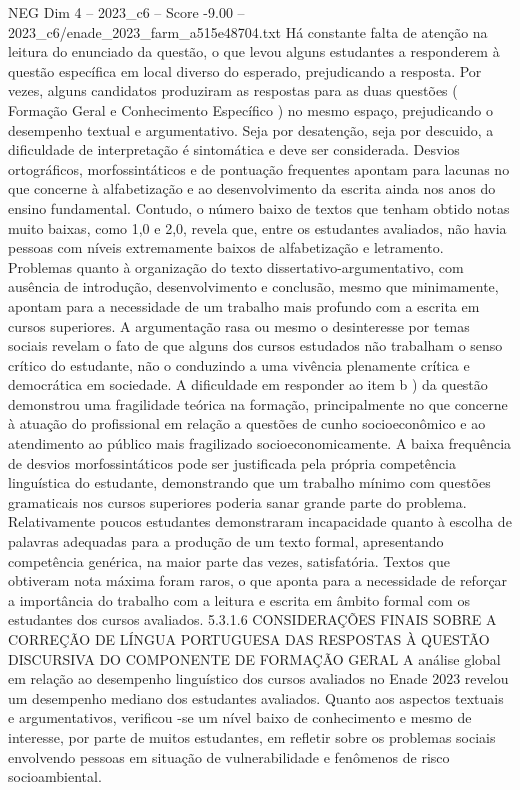 \begin{textsample}{NEG Dim 4 – 2023\_c6 – Score -9.00 – 2023\_c6/enade\_2023\_farm\_a515e48704.txt}
Há constante falta de atenção na leitura do enunciado da questão, o que levou alguns estudantes a responderem à questão específica em local diverso do esperado, prejudicando a resposta.
Por vezes, alguns candidatos produziram as respostas para as duas questões ( Formação Geral e Conhecimento Específico ) no mesmo espaço, prejudicando o desempenho textual e argumentativo.
Seja por desatenção, seja por descuido, a dificuldade de interpretação é sintomática e deve ser considerada.
Desvios ortográficos, morfossintáticos e de pontuação frequentes apontam para lacunas no que concerne à alfabetização e ao desenvolvimento da escrita ainda nos anos do ensino fundamental.
Contudo, o número baixo de textos que tenham obtido notas muito baixas, como 1,0 e 2,0, revela que, entre os estudantes avaliados, não havia pessoas com níveis extremamente baixos de alfabetização e letramento.
Problemas quanto à organização do texto dissertativo-argumentativo, com ausência de introdução, desenvolvimento e conclusão, mesmo que minimamente, apontam para a necessidade de um trabalho mais profundo com a escrita em cursos superiores.
A argumentação rasa ou mesmo o desinteresse por temas sociais revelam o fato de que alguns dos cursos estudados não trabalham o senso crítico do estudante, não o conduzindo a uma vivência plenamente crítica e democrática em sociedade.
A dificuldade em responder ao item b ) da questão demonstrou uma fragilidade teórica na formação, principalmente no que concerne à atuação do profissional em relação a questões de cunho socioeconômico e ao atendimento ao público mais fragilizado socioeconomicamente.
A baixa frequência de desvios morfossintáticos pode ser justificada pela própria competência linguística do estudante, demonstrando que um trabalho mínimo com questões gramaticais nos cursos superiores poderia sanar grande parte do problema.
Relativamente poucos estudantes demonstraram incapacidade quanto à escolha de palavras adequadas para a produção de um texto formal, apresentando competência genérica, na maior parte das vezes, satisfatória.
Textos que obtiveram nota máxima foram raros, o que aponta para a necessidade de reforçar a importância do trabalho com a leitura e escrita em âmbito formal com os estudantes dos cursos avaliados. 5.3.1.6 CONSIDERAÇÕES FINAIS SOBRE A CORREÇÃO DE LÍNGUA PORTUGUESA DAS RESPOSTAS À QUESTÃO DISCURSIVA DO COMPONENTE DE FORMAÇÃO GERAL A análise global em relação ao desempenho linguístico dos cursos avaliados no Enade 2023 revelou um desempenho mediano dos estudantes avaliados.
Quanto aos aspectos textuais e argumentativos, verificou -se um nível baixo de conhecimento e mesmo de interesse, por parte de muitos estudantes, em refletir sobre os problemas sociais envolvendo pessoas em situação de vulnerabilidade e fenômenos de risco socioambiental.

\end{textsample}
